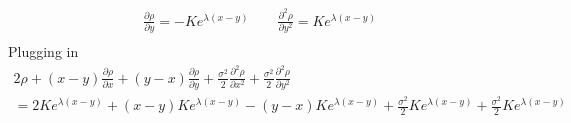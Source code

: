 \documentclass[12pt]{article}
\theoremstyle{plain}
\theoremstyle{definition}
\theoremstyle{remark}
\begin{document}
\begin{enumerate}
\begin{enumerate}
\begin{align*}
          \frac{\partial \rho}{\partial y} = -K e^{\lambda (x-y)}
          \qquad
          \frac{\partial^2 \rho}{\partial y^2} = K e^{\lambda (x-y)}\\
        \end{align*}
        Plugging in
        \begin{align*}
          2\rho + (x-y)\frac{\partial\rho}{\partial x}
          + (y-x)\frac{\partial\rho}{\partial y}
          + \frac{\sigma^2 }{2} \frac{\partial^2 \rho}{\partial x^2}
          + \frac{\sigma^2 }{2} \frac{\partial^2 \rho}{\partial y^2} \\
          =
          2K e^{\lambda (x-y)}
          + (x-y)K e^{\lambda (x-y)}
          - (y-x)K e^{\lambda (x-y)}
          + \frac{\sigma^2 }{2}K e^{\lambda (x-y)}
          + \frac{\sigma^2 }{2}K e^{\lambda (x-y)}
        \end{align*}

    \end{enumerate}
\end{enumerate}
\end{document}
